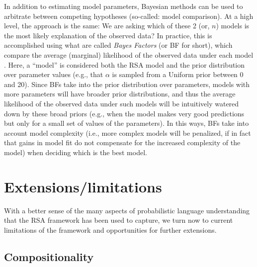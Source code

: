 \documentclass{sp}
\newcommand{\gcs}[1]{\textcolor{blue}{[gcs: #1]}}
\newcommand{\mht}[1]{\textcolor{purple}{[mht: #1]}}
\begin{document}
In addition to estimating model parameters, Bayesian methods can be used to arbitrate between competing hypotheses (so-called: model comparison). At a high level, the approach is the same: We are asking which of these 2 (or, $n$) models is the most likely explanation of the observed data? In practice, this is accomplished using what are called \emph{Bayes Factors} (or BF for short), which compare the average (marginal) likelihood of the observed data under each model \citep{lee2014bayesian}. Here, a ``model'' is considered both the RSA model and the prior distribution over parameter values (e.g., that $\alpha$ is sampled from a Uniform prior between 0 and 20). Since BFs take into the prior distribution over parameters, models with more parameters will have broader prior distributions, and thus the average likelihood of the observed data under such models will be intuitively watered down by these broad priors (e.g., when the model makes very good predictions but only for a small set of values of the parameters). In this ways, BFs take into account model complexity (i.e., more complex models will be penalized, if in fact that gains in model fit do not compensate for the increased complexity of the model) when deciding which is the best model.






 





\section{Extensions/limitations} \label{limitations}

With a better sense of the many aspects of probabilistic language understanding that the RSA framework has been used to capture, we turn now to current limitations of the framework and opportunities for further extensions.

\subsection{Compositionality}
\end{document}
